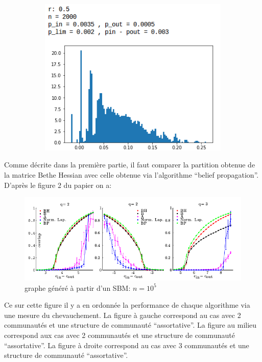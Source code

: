 \begin{figure}[H]
\begin{subfigure}{.5\textwidth}
		\label{bh1}
	\end{subfigure}
	\begin{subfigure}{.5\textwidth}
		\centering
		\includegraphics[scale=0.4]{static/bh_0_5.png}
		\label{bh05}
	\end{subfigure}
\end{figure}

Comme décrite dans la première partie, il faut comparer la partition obtenue de la matrice Bethe Hessian avec celle obtenue via l'algorithme ``belief propagation''.
D'après le figure 2 du papier \cite{bethe_hessian} on a:
\begin{figure}[H]
	\centering
	\includegraphics[scale=0.5]{static/bh_results.png}
	\caption{graphe généré à partir d'un SBM: $n=10^5$}
	\label{bhres}
\end{figure}
Ce sur cette figure il y a en ordonnée la performance de chaque algorithme via une mesure du chevauchement.
La figure à gauche correspond au cas avec 2 communautés et une structure de communauté ``assortative''.
La figure au milieu correspond aux cas avec 2 communautés et une structure de communauté ``assortative''.
La figure à droite correspond au cas avec 3 communautés et une structure de communauté ``assortative''.
